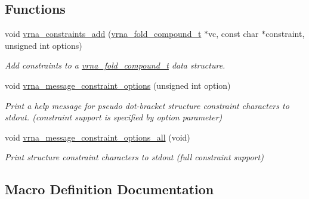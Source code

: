 \subsection*{Functions}
\begin{DoxyCompactItemize}
\item 
void \hyperlink{group__constraints_ga35a401f680969a556858a8dd5f1d07cc}{vrna\+\_\+constraints\+\_\+add} (\hyperlink{group__fold__compound_ga1b0cef17fd40466cef5968eaeeff6166}{vrna\+\_\+fold\+\_\+compound\+\_\+t} $\ast$vc, const char $\ast$constraint, unsigned int options)
\begin{DoxyCompactList}\small\item\em Add constraints to a \hyperlink{group__fold__compound_ga1b0cef17fd40466cef5968eaeeff6166}{vrna\+\_\+fold\+\_\+compound\+\_\+t} data structure. \end{DoxyCompactList}\item 
void \hyperlink{group__constraints_gaa1f20b53bf09ac2e6b0dbb13f7d89670}{vrna\+\_\+message\+\_\+constraint\+\_\+options} (unsigned int option)
\begin{DoxyCompactList}\small\item\em Print a help message for pseudo dot-\/bracket structure constraint characters to stdout. (constraint support is specified by option parameter) \end{DoxyCompactList}\item 
void \hyperlink{group__constraints_gaec7e13fa0465c2acc7a621d1aecb709f}{vrna\+\_\+message\+\_\+constraint\+\_\+options\+\_\+all} (void)
\begin{DoxyCompactList}\small\item\em Print structure constraint characters to stdout (full constraint support) \end{DoxyCompactList}\end{DoxyCompactItemize}


\subsection{Macro Definition Documentation}
\mbox{\label{group__constraints_ga62e0ed0c33002c09423de4e646f85a2b}} 
